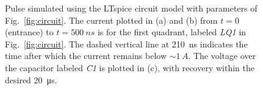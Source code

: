 \begin{refsection}
        
        \begin{figure}
        \centering
        \hfill
        \hfill
        \caption[muEDM: kicker pulse shape]{Pulse simulated using the LTspice circuit model with parameters of Fig.~\ref{fig:circuit}. The current plotted in (a) and (b) from $t=0$ (entrance) to $t=\SI{500}{ns}$ is for the first quadrant, labeled \textit{LQ1} in Fig.~\ref{fig:circuit}. The dashed vertical line at \SI{210}{ns} indicates the time after which the current remains below $\sim 1\,A$. The voltage over the capacitor labeled \textit{C1} is plotted in (c), with recovery within the desired \SI{20}{\micro s}.}
        \label{fig:pulses}
        \end{figure}


\end{refsection}
